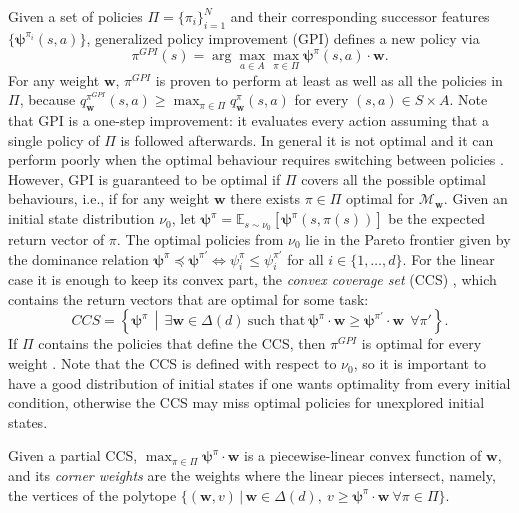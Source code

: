 \documentclass[11pt]{article}
\newcommand{\vpsi}{\bm{\psi}}      %
\begin{document}
Given a set of policies $\Pi = \{\pi_i\}_{i = 1}^N$ and their corresponding successor features $\{\vpsi^{\pi_i}(s,a)\}$, generalized policy improvement (GPI) \cite{barreto_successor_2017} defines a new policy via
\begin{equation}\label{eq:gpi}
    \pi^{GPI}(s) = \arg \max_{a \in A} \max_{\pi \in \Pi} \vpsi^{\pi}(s,a) \cdot \mathbf{w}.
\end{equation}
For any weight $\mathbf{w}$, $\pi^{GPI}$ is proven to perform at least as well as all the policies in $\Pi$, because $q_{\mathbf{w}}^{\pi^{GPI}}(s,a) \geq \max_{\pi \in \Pi} q_{\mathbf{w}}^{\pi}(s,a)$ for every $(s,a) \in S \times A$. Note that GPI is a one-step improvement: it evaluates every action assuming that a single policy of $\Pi$ is followed afterwards. In general it is not optimal and it can perform poorly when the optimal behaviour requires switching between policies \cite{hunt_composing_2019}. However, GPI is guaranteed to be optimal if $\Pi$ covers all the possible optimal behaviours, i.e., if for any weight $\mathbf{w}$ there exists $\pi \in \Pi$ optimal for $\mathcal{M}_{\mathbf{w}}$. Given an initial state distribution $\nu_0$, let $\vpsi^\pi = \mathbb{E}_{s \sim \nu_0} \left[ \vpsi^\pi(s, \pi(s)) \right]$ be the expected return vector of $\pi$. The optimal policies from $\nu_0$ lie in the Pareto frontier given by the dominance relation $\vpsi^\pi \preceq \vpsi^{\pi'} \iff \psi^\pi_i \leq \psi^{\pi'}_i$ for all $i \in \{1, \dots, d\}$. For the linear case it is enough to keep its convex part, the \textit{convex coverage set} (CCS) \cite{roijers_multi-objective_2016,alegre_optimistic_2022}, which contains the return vectors that are optimal for some task:
\begin{equation}
    CCS = \left \{\vpsi^\pi \,\middle|\, \exists \mathbf{w} \in \Delta(d) \ \text{such that} \ \vpsi^\pi \cdot \mathbf{w} \geq \vpsi^{\pi'} \cdot \mathbf{w} \ \ \forall \pi' \right \}.
\end{equation}
If $\Pi$ contains the policies that define the CCS, then $\pi^{GPI}$ is optimal for every weight \cite{alegre_optimistic_2022}. Note that the CCS is defined with respect to $\nu_0$, so it is important to have a good distribution of initial states if one wants optimality from every initial condition, otherwise the CCS may miss optimal policies for unexplored initial states.

Given a partial CCS, $\max_{\pi \in \Pi} \vpsi^\pi \cdot \mathbf{w}$ is a piecewise-linear convex function of $\mathbf{w}$, and its \textit{corner weights} are the weights where the linear pieces intersect, namely, the vertices of the polytope $\{(\mathbf{w}, v) \,|\, \mathbf{w} \in \Delta(d),\ v \geq \vpsi^\pi \cdot \mathbf{w}\ \forall \pi \in \Pi\}$. 
\end{document}
